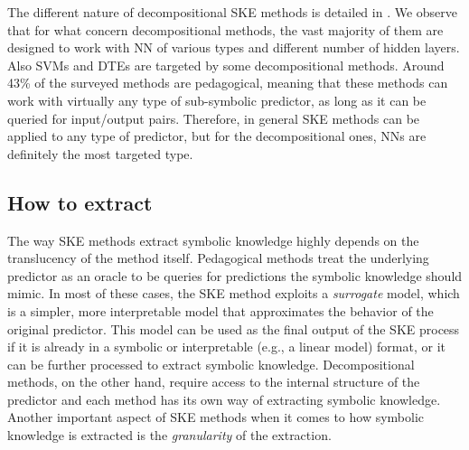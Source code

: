 The different nature of decompositional \gls{SKE} methods is detailed in .
%
We observe that for what concern decompositional methods, the vast majority of them are designed to work with \gls{NN} of various types and different number of hidden layers.
%
Also \glspl{SVM} and \glspl{DTE} are targeted by some decompositional methods.
%
Around 43\% of the surveyed methods are pedagogical, meaning that these methods can work with virtually any type of sub-symbolic predictor, as long as it can be queried for input/output pairs.
%
Therefore, in general \gls{SKE} methods can be applied to any type of predictor, but for the decompositional ones, \glspl{NN} are definitely the most targeted type.


\subsection{How to extract}\label{subsec:how-to-extract}
%
The way \gls{SKE} methods extract symbolic knowledge highly depends on the translucency of the method itself.
%
Pedagogical methods treat the underlying predictor as an oracle to be queries for predictions the symbolic knowledge should mimic.
%
%
In most of these cases, the \gls{SKE} method exploits a \emph{surrogate} model, which is a simpler, more interpretable model that approximates the behavior of the original predictor.
%
This model can be used as the final output of the \gls{SKE} process if it is already in a symbolic or interpretable (e.g., a linear model) format, or it can be further processed to extract symbolic knowledge.
%
Decompositional methods, on the other hand, require access to the internal structure of the predictor and each method has its own way of extracting symbolic knowledge.
%
%
Another important aspect of \gls{SKE} methods when it comes to how symbolic knowledge is extracted is the \emph{granularity} of the extraction.

